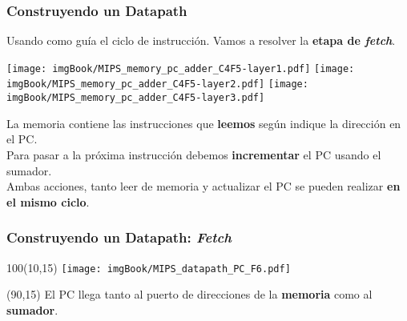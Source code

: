 \documentclass[aspectratio=169]{beamer}
\begin{document}
\begin{frame}[t,fragile]
    \frametitle{Construyendo un Datapath}
    Usando como guía el ciclo de instrucción. \textcolor{verdeuca}{Vamos a resolver la \textbf{etapa de \emph{fetch}}.}\\
    \begin{center}
    \texttt{[image: imgBook/MIPS\_memory\_pc\_adder\_C4F5-layer1.pdf]}
    \texttt{[image: imgBook/MIPS\_memory\_pc\_adder\_C4F5-layer2.pdf]}
    \texttt{[image: imgBook/MIPS\_memory\_pc\_adder\_C4F5-layer3.pdf]}
    \end{center}
    \pause
    La memoria contiene las instrucciones que \textbf{leemos} según indique la dirección en el PC.\\
    \bigskip
    Para pasar a la próxima instrucción debemos \textbf{incrementar} el PC usando el sumador.\\
    \bigskip
    \textcolor{verdeuca}{Ambas acciones, tanto leer de memoria y actualizar el PC se pueden realizar \textbf{en el mismo ciclo}.}\\
\end{frame}

\begin{frame}[t,fragile]
    \frametitle{Construyendo un Datapath: \emph{Fetch}}
    \begin{textblock}{100}(10,15)
    \texttt{[image: imgBook/MIPS\_datapath\_PC\_F6.pdf]}
    \end{textblock}
    \begin{textblock}{60}(90,15)
    El PC llega tanto al puerto de direcciones de la \textbf{memoria} como al \textbf{sumador}.\\
    \bigskip
    \bigskip
    \bigskip
    \end{textblock}
\end{frame}
\end{document}
